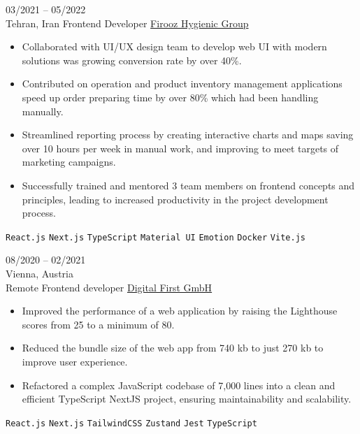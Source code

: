 \documentclass[8pt]{developercv} %
\begin{document}
\begin{entrylist}
        \entry
        {03/2021 -- 05/2022 \\ Tehran, Iran}
        {Frontend Developer}
        {\href{https://firoozshop.com/}{Firooz Hygienic Group}}
        {\vspace{-10pt}
            \begin{itemize}[noitemsep,topsep=0pt,parsep=0pt,partopsep=0pt, leftmargin=-1pt]
                \item Collaborated with UI/UX design team to develop web UI with modern solutions was growing conversion rate by over 40\%.
                \item Contributed on operation and product inventory management applications speed up order preparing time by over 80\% which had been handling manually.
                \item Streamlined reporting process by creating interactive charts and maps saving over 10 hours per week in manual work, and improving to meet targets of marketing campaigns.
                \item Successfully trained and mentored 3 team members on frontend concepts and principles, leading to increased productivity in the project development process.
            \end{itemize}
            \texttt{React.js} \slashsep \texttt{Next.js} \slashsep \texttt{TypeScript} \slashsep \texttt{Material UI} \slashsep \texttt{Emotion} \slashsep \texttt{Docker} \slashsep \texttt{Vite.js}
        }

        \entry
        {08/2020 -- 02/2021 \\ Vienna, Austria \\ Remote}
        {Frontend developer}
        {\href{https://dfirst.eu/}{Digital First GmbH}}
        {\vspace{-10pt}
            \begin{itemize}[noitemsep,topsep=0pt,parsep=0pt,partopsep=0pt, leftmargin=-1pt]
                \item Improved the performance of a web application by raising the Lighthouse scores from 25 to a minimum of 80.
                \item Reduced the bundle size of the web app from 740 kb to just 270 kb to improve user experience.
                \item Refactored a complex JavaScript codebase of 7,000 lines into a clean and efficient TypeScript NextJS project, ensuring maintainability and scalability.
            \end{itemize}
            \texttt{React.js} \slashsep \texttt{Next.js} \slashsep \texttt{TailwindCSS} \slashsep \texttt{Zustand} \slashsep \texttt{Jest} \slashsep \texttt{TypeScript}
        }


\end{entrylist}
\end{document}
